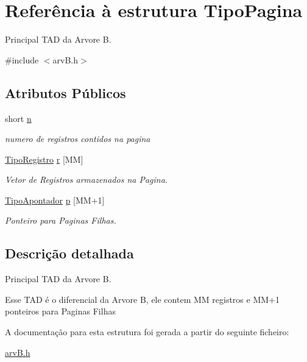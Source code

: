 \hypertarget{structTipoPagina}{}\section{Referência à estrutura Tipo\+Pagina}
\label{structTipoPagina}


Principal T\+AD da Arvore B.  




{\ttfamily \#include $<$arv\+B.\+h$>$}

\subsection*{Atributos Públicos}
\begin{DoxyCompactItemize}
\item 
\mbox{\label{structTipoPagina_ada23d982818790ac83a647542eef0be3}} 
short \hyperlink{structTipoPagina_ada23d982818790ac83a647542eef0be3}{n}
\begin{DoxyCompactList}\small\item\em numero de registros contidos na pagina \end{DoxyCompactList}\item 
\mbox{\label{structTipoPagina_a4bef5f8f437494c1a3a8b2c3be98c30d}} 
\hyperlink{structTipoRegistro}{Tipo\+Registro} \hyperlink{structTipoPagina_a4bef5f8f437494c1a3a8b2c3be98c30d}{r} \mbox{[}MM\mbox{]}
\begin{DoxyCompactList}\small\item\em Vetor de Registros armazenados na Pagina. \end{DoxyCompactList}\item 
\mbox{\label{structTipoPagina_a86205b5673504a179f26c606ac7221b8}} 
\hyperlink{arvB_8h_a20f89be0a510089bb26e2691d3223d21}{Tipo\+Apontador} \hyperlink{structTipoPagina_a86205b5673504a179f26c606ac7221b8}{p} \mbox{[}MM+1\mbox{]}
\begin{DoxyCompactList}\small\item\em Ponteiro para Paginas Filhas. \end{DoxyCompactList}\end{DoxyCompactItemize}


\subsection{Descrição detalhada}
Principal T\+AD da Arvore B. 

Esse T\+AD é o diferencial da Arvore B, ele contem MM registros e M\+M+1 ponteiros para Paginas Filhas 

A documentação para esta estrutura foi gerada a partir do seguinte ficheiro\+:\begin{DoxyCompactItemize}
\item 
\hyperlink{arvB_8h}{arv\+B.\+h}\end{DoxyCompactItemize}
